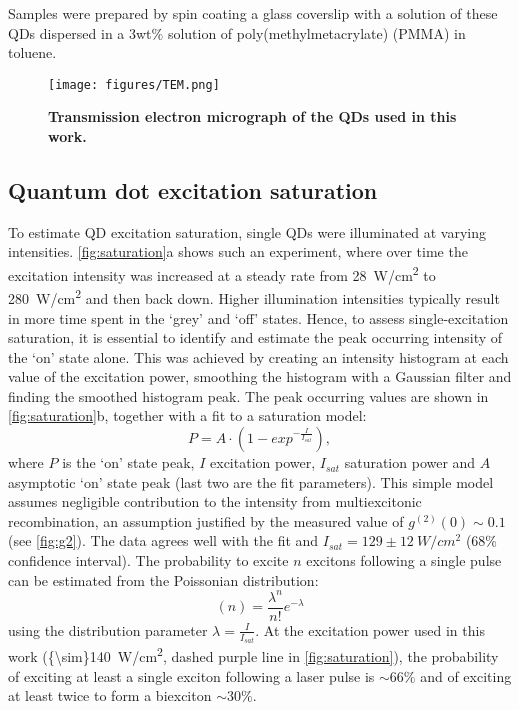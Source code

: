 \documentclass[journal=nalefd, manuscript=letter, layout=twocolumn]{achemso}
\begin{document}
Samples were prepared by spin coating a glass coverslip with a solution of these QDs dispersed in a 3wt\% solution of poly(methylmetacrylate) (PMMA) in toluene.

\begin{figure}[h]
    \centering
    \texttt{[image: figures/TEM.png]}
    \caption{\textbf{Transmission electron micrograph of the QDs used in this work.}}
    \label{fig:tem}
\end{figure}

\subsection{Quantum dot excitation saturation}\label{sec:saturation}

To estimate QD excitation saturation, single QDs were illuminated at varying intensities. \autoref{fig:saturation}a shows such an experiment, where over time the excitation intensity was increased at a steady rate from \SI{28}{W/cm^2} to \SI{280}{W/cm^2} and then back down. Higher illumination intensities typically result in more time spent in the `grey' and `off' states. Hence, to assess single-excitation saturation, it is essential to identify and estimate the peak occurring intensity of the `on' state alone. This was achieved by creating an intensity histogram at each value of the excitation power, smoothing the histogram with a Gaussian filter and finding the smoothed histogram peak. The peak occurring values are shown in \autoref{fig:saturation}b, together with a fit to a saturation model\cite{Teitelboim2016}:
\begin{equation}
    P = A \cdot \left( 1-exp^{-\frac{I}{I_{sat}}} \right),     
\end{equation}
where $P$ is the `on' state peak, $I$ excitation power, $I_{sat}$ saturation power and $A$ asymptotic `on' state peak (last two are the fit parameters). This simple model assumes negligible contribution to the intensity from multiexcitonic recombination, an assumption justified by the measured value of $g^{(2)}(0)\sim0.1$ (see \autoref{fig:g2}). The data agrees well with the fit and $I_{sat}=129\pm\SI{12}{W/cm^2}$ (68\% confidence interval). The probability to excite $n$ excitons following a single pulse can be estimated from the Poissonian distribution:
\begin{equation}
    (n) = \frac{\lambda^n}{n!}e^{-\lambda}
\end{equation} 
using the distribution parameter $\lambda = \frac{I}{I_{sat}}$. At the excitation power used in this work (\SI{{\sim}140}{W/cm^2}, dashed purple line in \autoref{fig:saturation}), the probability of exciting at least a single exciton following a laser pulse is ${\sim}66\%$ and of exciting at least twice to form a biexciton ${\sim}30\%$.
\end{document}
